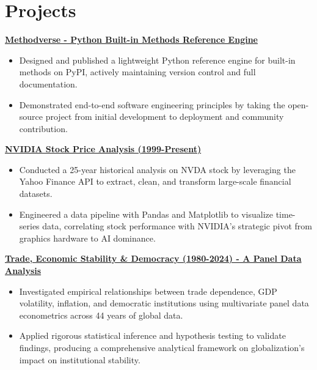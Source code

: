 \documentclass[10pt, a4paper]{article}
\begin{document}
	\section{Projects}
	\noindent\href{https://github.com/marvinminhaz/methodverse}{\textbf{Methodverse - Python Built-in Methods Reference Engine}}\hfill
	\begin{itemize}[leftmargin=0.15in, topsep=2pt, partopsep=0pt, parsep=0pt, itemsep=2pt]
		\item Designed and published a lightweight Python reference engine for built-in methods on PyPI, actively maintaining version control and full documentation.
		\item Demonstrated end-to-end software engineering principles by taking the open-source project from initial development to deployment and community contribution.
	\end{itemize}
	\vspace{0.6em}
	
	\noindent\href{https://github.com/marvinminhaz/nvidia-stock-insights}{\textbf{NVIDIA Stock Price Analysis (1999-Present)}} \hfill
	\begin{itemize}[leftmargin=0.15in, topsep=2pt, partopsep=0pt, parsep=0pt, itemsep=2pt]
		\item Conducted a 25-year historical analysis on NVDA stock by leveraging the Yahoo Finance API to extract, clean, and transform large-scale financial datasets.
		\item Engineered a data pipeline with Pandas and Matplotlib to visualize time-series data, correlating stock performance with NVIDIA's strategic pivot from graphics hardware to AI dominance.
	\end{itemize}
	\vspace{0.6em}
	
	\noindent\href{https://github.com/marvinminhaz/Trade_dependence_Economic_Stability_and_Democracy_Project}{\textbf{Trade, Economic Stability \& Democracy (1980-2024) - A Panel Data Analysis}} \hfill 
	\begin{itemize}[leftmargin=0.15in, partopsep=0pt, parsep=0pt, topsep=2pt, itemsep=2pt]
		\item Investigated empirical relationships between trade dependence, GDP volatility, inflation, and democratic institutions using multivariate panel data econometrics across 44 years of global data.
		\item Applied rigorous statistical inference and hypothesis testing to validate findings, producing a comprehensive analytical framework on globalization's impact on institutional stability.
	\end{itemize}
	\vspace{0.6em}
	
\end{document}
